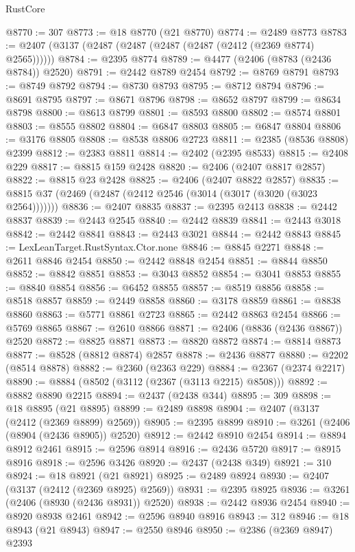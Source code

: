 \begin{lexlean}{RustCore}
\begin{coremodule}
@8770 := 307
@8773 := @18 @8770 (@21 @8770)
@8774 := @2489 @8773
@8783 := @2407 (@3137 (@2487 (@2487 (@2487 (@2487 (@2412 (@2369 @8774) @2565))))))
@8784 := @2395 @8774
@8789 := @4477 (@2406 (@8783 (@2436 @8784)) @2520)
@8791 := @2442 @8789 @2454
@8792 := @8769 @8791
@8793 := @8749 @8792
@8794 := @8730 @8793
@8795 := @8712 @8794
@8796 := @8691 @8795
@8797 := @8671 @8796
@8798 := @8652 @8797
@8799 := @8634 @8798
@8800 := @8613 @8799
@8801 := @8593 @8800
@8802 := @8574 @8801
@8803 := @8555 @8802
@8804 := @6847 @8803
@8805 := @6847 @8804
@8806 := @3176 @8805
@8808 := @8538 @8806 @2723
@8811 := @2385 (@8536 @8808) @2399
@8812 := @2383 @8811
@8814 := @2402 (@2395 @8533)
@8815 := @2408 @229
@8817 := @8815 @159 @2428
@8820 := @2406 (@2407 @8817 @2857)
@8822 := @8815 @23 @2428
@8825 := @2406 (@2407 @8822 @2857)
@8835 := @8815 @37 (@2469 (@2487 (@2412 @2546 (@3014 (@3017 (@3020 (@3023 @2564)))))))
@8836 := @2407 @8835
@8837 := @2395 @2413
@8838 := @2442 @8837
@8839 := @2443 @2545
@8840 := @2442 @8839
@8841 := @2443 @3018
@8842 := @2442 @8841
@8843 := @2443 @3021
@8844 := @2442 @8843
@8845 := LexLeanTarget.RustSyntax.Ctor.none
@8846 := @8845 @2271
@8848 := @2611 @8846 @2454
@8850 := @2442 @8848 @2454
@8851 := @8844 @8850
@8852 := @8842 @8851
@8853 := @3043 @8852
@8854 := @3041 @8853
@8855 := @8840 @8854
@8856 := @6452 @8855
@8857 := @8519 @8856
@8858 := @8518 @8857
@8859 := @2449 @8858
@8860 := @3178 @8859
@8861 := @8838 @8860
@8863 := @5771 @8861 @2723
@8865 := @2442 @8863 @2454
@8866 := @5769 @8865
@8867 := @2610 @8866
@8871 := @2406 (@8836 (@2436 @8867)) @2520
@8872 := @8825 @8871
@8873 := @8820 @8872
@8874 := @8814 @8873
@8877 := @8528 (@8812 @8874) @2857
@8878 := @2436 @8877
@8880 := @2202 (@8514 @8878)
@8882 := @2360 (@2363 @229)
@8884 := @2367 (@2374 @2217)
@8890 := @8884 (@8502 (@3112 (@2367 (@3113 @2215) @8508)))
@8892 := @8882 @8890 @2215
@8894 := @2437 (@2438 @344)
@8895 := 309
@8898 := @18 @8895 (@21 @8895)
@8899 := @2489 @8898
@8904 := @2407 (@3137 (@2412 (@2369 @8899) @2569))
@8905 := @2395 @8899
@8910 := @3261 (@2406 (@8904 (@2436 @8905)) @2520)
@8912 := @2442 @8910 @2454
@8914 := @8894 @8912 @2461
@8915 := @2596 @8914
@8916 := @2436 @5720
@8917 := @8915 @8916
@8918 := @2596 @3426
@8920 := @2437 (@2438 @349)
@8921 := 310
@8924 := @18 @8921 (@21 @8921)
@8925 := @2489 @8924
@8930 := @2407 (@3137 (@2412 (@2369 @8925) @2569))
@8931 := @2395 @8925
@8936 := @3261 (@2406 (@8930 (@2436 @8931)) @2520)
@8938 := @2442 @8936 @2454
@8940 := @8920 @8938 @2461
@8942 := @2596 @8940 @8916
@8943 := 312
@8946 := @18 @8943 (@21 @8943)
@8947 := @2550 @8946
@8950 := @2386 (@2369 @8947) @2393

\end{coremodule}
\end{lexlean}
